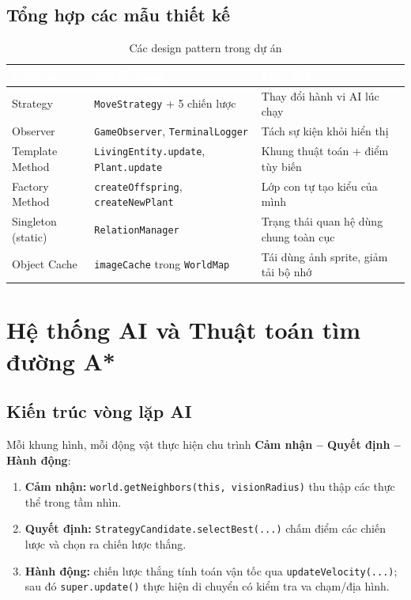 \documentclass[12pt,a4paper]{report}
\newcommand{\keyword}[1]{\textcolor{primaryblue}{\textbf{#1}}}
\newcommand{\code}[1]{\texttt{\small #1}}
\begin{document}
\section{Tổng hợp các mẫu thiết kế}

\begin{table}[H]
\centering
\caption{Các design pattern trong dự án}
\begin{tabular}{L{3.3cm} L{4.5cm} L{4.5cm}}
\toprule
{}\textcolor{white}{\textbf{Pattern}} & \textcolor{white}{\textbf{Nơi áp dụng}} & \textcolor{white}{\textbf{Mục đích}} \\
\midrule
Strategy & \code{MoveStrategy} + 5 chiến lược & Thay đổi hành vi AI lúc chạy \\
 Observer & \code{GameObserver}, \code{TerminalLogger} & Tách sự kiện khỏi hiển thị \\
Template Method & \code{LivingEntity.update}, \code{Plant.update} & Khung thuật toán + điểm tùy biến \\
 Factory Method & \code{createOffspring}, \code{createNewPlant} & Lớp con tự tạo kiểu của mình \\
Singleton (static) & \code{RelationManager} & Trạng thái quan hệ dùng chung toàn cục \\
 Object Cache & \code{imageCache} trong \code{WorldMap} & Tái dùng ảnh sprite, giảm tải bộ nhớ \\
\bottomrule
\end{tabular}
\end{table}

\chapter{Hệ thống AI và Thuật toán tìm đường A*}

\section{Kiến trúc vòng lặp AI}

Mỗi khung hình, mỗi động vật thực hiện chu trình \keyword{Cảm nhận -- Quyết định -- Hành động}:

\begin{enumerate}[leftmargin=2em]
    \item \textbf{Cảm nhận:} \code{world.getNeighbors(this, visionRadius)} thu thập các thực thể trong tầm nhìn.
    \item \textbf{Quyết định:} \code{StrategyCandidate.selectBest(...)} chấm điểm các chiến lược và chọn ra chiến lược thắng.
    \item \textbf{Hành động:} chiến lược thắng tính toán vận tốc qua \code{updateVelocity(...)}; sau đó \code{super.update()} thực hiện di chuyển có kiểm tra va chạm/địa hình.
\end{enumerate}
\end{document}
